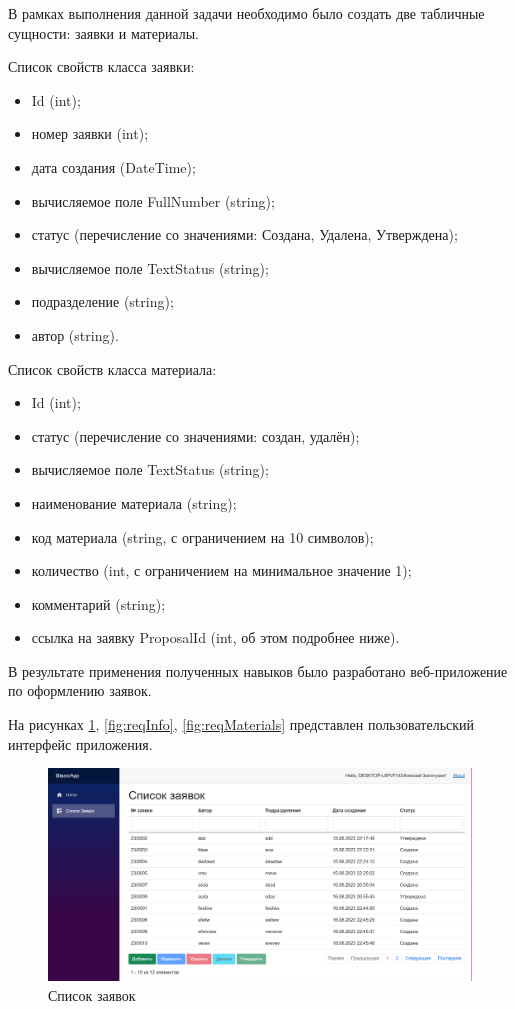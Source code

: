 \documentclass[a4paper,14pt]{extreport}
\begin{document}
	В рамках выполнения данной задачи необходимо было создать две табличные сущности: заявки и материалы.
	
	Список свойств класса заявки:
	
	\begin{itemize}
		\item Id (int);
		\item номер заявки (int);
		\item дата создания (DateTime);
		\item вычисляемое поле FullNumber (string);
		\item статус (перечисление со значениями: Создана, Удалена, Утверждена);
		\item вычисляемое поле TextStatus (string);
		\item подразделение (string);
		\item автор (string).
	\end{itemize}
	
	Список свойств класса материала:
	
	\begin{itemize}
		\item Id (int);
		\item статус (перечисление со значениями: создан, удалён);
		\item вычисляемое поле TextStatus (string);
		\item наименование материала (string);
		\item код материала (string, с ограничением на 10 символов);
		\item количество (int, с ограничением на минимальное значение 1);
		\item комментарий (string);
		\item ссылка на заявку ProposalId (int, об этом подробнее ниже).
	\end{itemize}

	В результате применения полученных навыков было разработано веб-приложение по оформлению заявок.
	
	На рисунках \ref{fig:reqList}, \ref{fig:reqInfo}, \ref{fig:reqMaterials}  представлен пользовательский интерфейс приложения.
	
\begin{figure}[H]
	\centering
	\includegraphics[width=1\linewidth]{"Screenshot 2023-08-20 113401"}
	\caption{Список заявок}
	\label{fig:reqList}
\end{figure}
\end{document}
